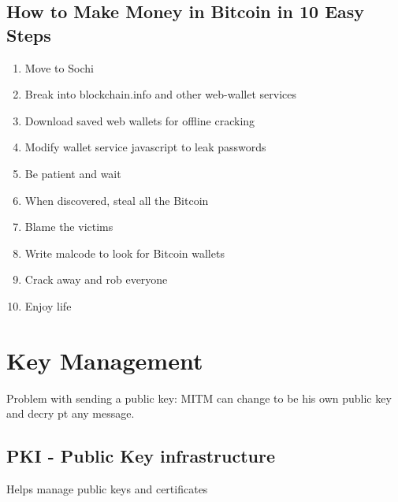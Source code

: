 \documentclass{article}
\begin{document}
\subsection{How to Make Money in Bitcoin in 10 Easy Steps}
\begin{enumerate}
\item Move to Sochi
\item Break into blockchain.info and other web-wallet services
\item Download saved web wallets for offline cracking
\item Modify wallet service javascript to leak passwords
\item Be patient and wait
\item When discovered, steal all the Bitcoin
\item Blame the victims
\item Write malcode to look for Bitcoin wallets
\item Crack away and rob everyone
\item Enjoy life
\end{enumerate}




\section{Key Management}
Problem with sending a public key: MITM can change to be his own public key and decry pt any message.
\subsection{PKI - Public Key infrastructure }
Helps manage public keys and certificates
\end{document}
